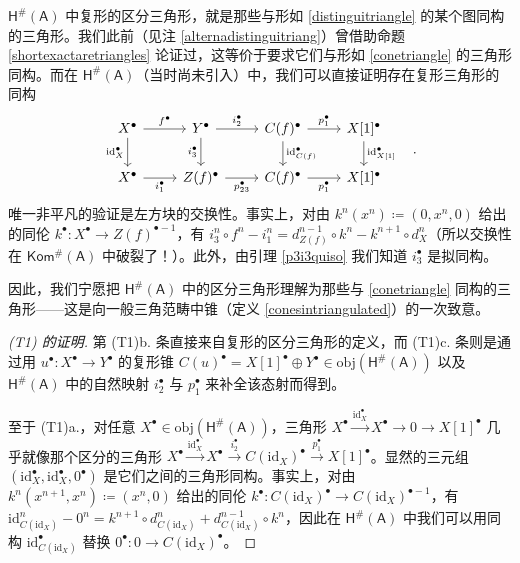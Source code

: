 \begin{Rem}
	$\mathsf{H^\#\!(A)}$ 中复形的区分三角形，就是那些与形如 \eqref{distinguitriangle} 的某个图同构的三角形。我们此前（见注 \ref{alternadistinguitriang}）曾借助命题 \ref{shortexactaretriangles} 论证过，这等价于要求它们与形如 \eqref{conetriangle} 的三角形同构。而在 $\mathsf{H^\#\!(A)}$（当时尚未引入）中，我们可以直接证明存在复形三角形的同构
	\[
	\begin{tikzcd}
		X^\bullet\arrow[r, "f^\bullet"]\arrow[d, "\text{id}_X^\bullet"'] & Y^\bullet\arrow[r, "i_2^\bullet"]\arrow[d, "i_3^\bullet"'] & C(f)^\bullet\arrow[r, "p_1^\bullet"]\arrow[d, "\text{id}_{C(f)}^\bullet"] & X[1]^\bullet\arrow[d, "\text{id}_{X[1]}^\bullet"] \\
		X^\bullet\arrow[r, "i_1^\bullet"'] & Z(f)^\bullet\arrow[r, "p_{23}^\bullet"'] & C(f)^\bullet\arrow[r, "p_1^\bullet"'] & X[1]^\bullet
	\end{tikzcd}\quad.
	\]
	唯一非平凡的验证是左方块的交换性。事实上，对由 $k^n(x^n)\coloneqq(0,x^n,0)$ 给出的同伦 $k^\bullet:X^\bullet\rightarrow Z(f)^{\bullet-1}$，有 $i_3^n\circ f^n - i_1^n= d_{Z(f)}^{n-1}\circ k^n-k^{n+1}\circ d_X^n$（所以交换性在 $\mathsf{Kom^\#\!(A)}$ 中破裂了！）。此外，由引理 \ref{p3i3quiso} 我们知道 $i_3^\bullet$ 是拟同构。
\end{Rem}

因此，我们宁愿把 $\mathsf{H^\#\!(A)}$ 中的区分三角形理解为那些与 \eqref{conetriangle} 同构的三角形——这是向一般三角范畴中锥（定义 \ref{conesintriangulated}）的一次致意。

\begin{proof}[(\textup{T1}) 的证明]
	第 (T1)b. 条直接来自复形的区分三角形的定义，而 (T1)c. 条则是通过用 $u^\bullet:X^\bullet\rightarrow Y^\bullet$ 的复形锥 $C(u)^\bullet=X[1]^\bullet\oplus Y^\bullet\in\text{obj}(\mathsf{H^\#\!(A)})$ 以及 $\mathsf{H^\#\!(A)}$ 中的自然映射 $i_2^\bullet$ 与 $p_1^\bullet$ 来补全该态射而得到。
	
	至于 (T1)a.，对任意 $X^\bullet\in\text{obj}(\mathsf{H^\#\!(A)})$，三角形 $X^\bullet\xrightarrow{\text{id}_X^\bullet}X^\bullet\rightarrow 0\rightarrow X[1]^\bullet$ 几乎就像那个区分的三角形 $X^\bullet\xrightarrow{\text{id}_X^\bullet}X^\bullet\xrightarrow{i_2^\bullet} C(\text{id}_X)^\bullet\xrightarrow{p_1^\bullet} X[1]^\bullet$。显然的三元组 $(\text{id}_X^\bullet,\text{id}_X^\bullet,0^\bullet)$ 是它们之间的三角形同构。事实上，对由 $k^n(x^{n+1},x^n)\coloneqq(x^n,0)$ 给出的同伦 $k^\bullet:C(\text{id}_X)^\bullet\rightarrow C(\text{id}_X)^{\bullet-1}$，有 $\text{id}_{C(\text{id}_X)}^n-0^n=k^{n+1}\circ d_{C(\text{id}_X)}^n+d_{C(\text{id}_X)}^{n-1}\circ k^n$，因此在 $\mathsf{H^\#\!(A)}$ 中我们可以用同构 $\text{id}_{C(\text{id}_X)}^\bullet$ 替换 $0^\bullet:0\rightarrow C(\text{id}_X)^\bullet$。
\end{proof}


